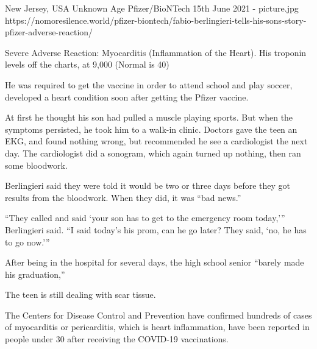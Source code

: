 {New Jersey, USA}
{Unknown Age}
{Pfizer/BioNTech}
{15th June 2021}
{-}
{picture.jpg}
{https://nomoresilence.world/pfizer-biontech/fabio-berlingieri-tells-his-sons-story-pfizer-adverse-reaction/}
{


Severe Adverse Reaction: Myocarditis (Inflammation of the Heart). His troponin levels off the charts, at 9,000 (Normal is 40)

He was required to get the vaccine in order to attend school and play soccer, developed a heart condition soon after getting the Pfizer vaccine.

At first he thought his son had pulled a muscle playing sports. But when the symptoms persisted, he took him to a walk-in clinic. Doctors gave the teen an EKG, and found nothing wrong, but recommended he see a cardiologist the next day. The cardiologist did a sonogram, which again turned up nothing, then ran some bloodwork.

Berlingieri said they were told it would be two or three days before they got results from the bloodwork. When they did, it was “bad news.”

“They called and said ‘your son has to get to the emergency room today,’” Berlingieri said. “I said today’s his prom, can he go later? They said, ‘no, he has to go now.’”

After being in the hospital for several days, the high school senior “barely made his graduation,”

The teen is still dealing with scar tissue.

The Centers for Disease Control and Prevention have confirmed hundreds of cases of myocarditis or pericarditis, which is heart inflammation, have been reported in people under 30 after receiving the COVID-19 vaccinations.
}
